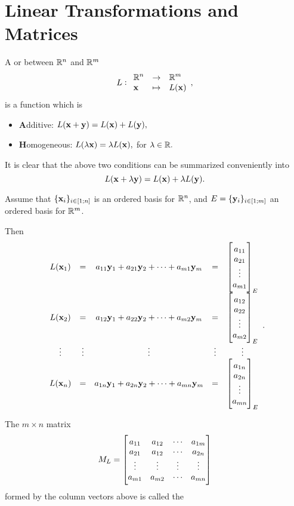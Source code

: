 \section{Linear Transformations and Matrices}

\begin{df}
 A  or  
 between $\mathbb{R}^n$ and $\mathbb{R}^m$
$$\fun{L}{\vector{x}}{L(\vector{x})}{\bbR^n}{\bbR^m},$$is a function which
is \begin{itemize} \item {\textbf  Additive:} $L(\mathbf{ x} + \mathbf{ y}) = L(\mathbf{ x})
+ L(\mathbf{ y}),$ \item {\textbf  Homogeneous:} $L(\lambda\mathbf{ x}) = \lambda
L(\mathbf{ x}),$ for $\lambda\in \mathbb{R}.$
\end{itemize}
\end{df}
\begin{rem}
It is clear that the above two conditions can be summarized
conveniently into $$L(\mathbf{ x} + \lambda\mathbf{ y}) = L(\mathbf{ x}) + \lambda
L(\mathbf{ y}).       $$
\end{rem}

Assume that  $\{\mathbf{ x}_i\}_{i\in [1;n]}$ is an ordered basis for $\mathbb{R}^n$, and $E = \{\mathbf{ y}_i\}_{i\in [1;m]}$ an
ordered basis for $\mathbb{R}^m$. 

Then
$$ \begin{array}{ccccc}L(\mathbf{ x}_1) &  = & a_{11}\mathbf{ y}_1 +  a_{21}\mathbf{ y}_2 + \cdots +
a_{m1}\mathbf{ y}_m & = & \begin{bmatrix} a_{11} \\ a_{21} \\ \vdots \\
a_{m1} \end{bmatrix}_E
\\
L(\mathbf{ x}_2)  & =  & a_{12}\mathbf{ y}_1 +  a_{22}\mathbf{ y}_2 +
\cdots + a_{m2}\mathbf{ y}_m   & = & \begin{bmatrix} a_{12} \\ a_{22} \\ \vdots \\
a_{m2} \end{bmatrix}_E         \\
\vdots & \vdots &   \vdots & \vdots & \vdots  \\
 L(\mathbf{ x}_n) & = &
a_{1n}\mathbf{ y}_1 +  a_{2n}\mathbf{ y}_2 + \cdots +
a_{mn}\mathbf{ y}_m  & = & \begin{bmatrix} a_{1n} \\ a_{2n} \\ \vdots \\
a_{mn} \end{bmatrix}_E\\
\end{array}. $$
\begin{df}
The $m\times n$ matrix $$ M_L = \begin{bmatrix} a_{11} & a_{12} &
\cdots & a_{1m} \cr a_{21} & a_{12} & \cdots & a_{2n} \cr \vdots &
\vdots & \vdots & \vdots \cr
 a_{m1} &
a_{m2} & \cdots & a_{mn} \cr
\end{bmatrix}
$$formed by the column vectors above is called the 
\end{df}

